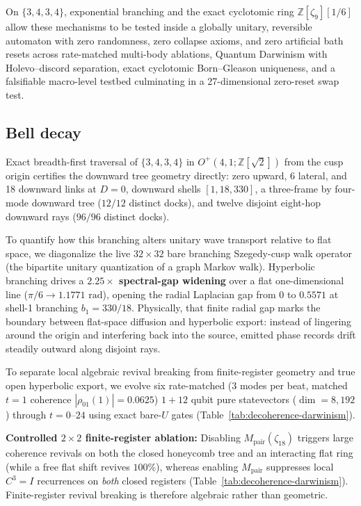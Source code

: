 On $\{3,4,3,4\}$, exponential branching and the exact cyclotomic ring $\mathbb{Z}[\zeta_9][1/6]$ allow these
mechanisms to be tested inside a globally unitary, reversible automaton with zero randomness, zero collapse axioms, and
zero artificial bath resets across rate-matched multi-body ablations, Quantum Darwinism with Holevo--discord separation,
exact cyclotomic Born--Gleason uniqueness, and a falsifiable macro-level testbed culminating in a 27-dimensional
zero-reset swap test.

\subsection{Bell decay}

Exact breadth-first traversal of $\{3,4,3,4\}$ in $O^+(4,1; \mathbb{Z}[\sqrt{2}])$ from the cusp origin certifies the
downward tree geometry directly: zero upward, 6 lateral, and 18 downward links at $D = 0$, downward shells
$[1, 18, 330]$, a three-frame by four-mode downward tree ($12/12$ distinct docks), and twelve disjoint eight-hop
downward rays ($96/96$ distinct docks).

To quantify how this branching alters unitary wave transport relative to flat space, we diagonalize the live
$32 \times 32$ bare branching Szegedy-cusp walk operator (the bipartite unitary quantization of a graph Markov walk).
Hyperbolic branching drives a \textbf{$2.25\times$ spectral-gap widening} over a flat one-dimensional line
($\pi/6 \to 1.1771\text{ rad}$), opening the radial Laplacian gap from $0$ to $0.5571$ at shell-1 branching
$b_1 = 330/18$. Physically, that finite radial gap marks the boundary between flat-space diffusion and hyperbolic
export: instead of lingering around the origin and interfering back into the source, emitted phase records drift
steadily outward along disjoint rays.

To separate local algebraic revival breaking from finite-register geometry and true open hyperbolic export, we evolve
six rate-matched ($3$ modes per beat, matched $t = 1$ coherence $|\rho_{01}(1)| = 0.0625$) $1 + 12$ qubit pure
statevectors ($\dim = 8{,}192$) through $t = 0\text{--}24$ using exact bare-$U$ gates
(Table~\ref{tab:decoherence-darwinism}).

\textbf{Controlled $2 \times 2$ finite-register ablation:} Disabling $M_{\mathrm{pair}}(\zeta_{18})$ triggers large
coherence revivals on both the closed honeycomb tree and an interacting flat ring (while a free flat shift revives
$100\%$), whereas enabling $M_{\mathrm{pair}}$ suppresses local $C^3 = I$ recurrences on \emph{both} closed registers
(Table~\ref{tab:decoherence-darwinism}). Finite-register revival breaking is therefore algebraic rather than geometric.

